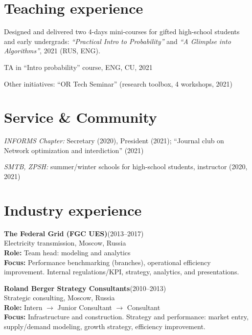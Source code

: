 \documentclass[11pt]{article} \usepackage{geometry} %
\newcommand{\jobl}[5]{%
  \textbf{#1}\hfill (#2)\\
  #3\vspace{0.25em}\\
  \textbf{Role:} #4\\
  \textbf{Focus:} #5}
\newcommand{\job}[5]{%
  \jobl{#1}{#2}{#3}{#4}{#5}\vspace{0.5em}
}
\begin{document}
 \begin{minipage}[t]{0.49\textwidth}
   \section*{Teaching experience}
   Designed and delivered  two 4-days mini-courses for gifted
   high-school students and early undergrads: \textit{``Practical Intro to Probability''}
   and \textit{``A Glimplse into Algorithms''}, 2021 (RUS, ENG).

   TA in ``Intro probability'' course, ENG, CU, 2021\vspace{0.3em}

   Other initiatives: ``OR Tech Seminar'' (research toolbox, 4 workshops, 2021)

   \section*{Service \& Community}
   \textit{INFORMS Chapter:} Secretary (2020),
   President (2021);
   ``Journal club on Network optimization and interdiction'' (2021)

   \textit{SMTB, ZPSH:} summer/winter schools for high-school students,
   instructor (2020, 2021)\\

   \section*{Industry experience}
   \job{The Federal Grid (FGC UES)}{2013--2017}{Electricity transmission,
     Moscow, Russia}{Team head: modeling and analytics}{Performance
     benchmarking (branches), operational efficiency improvement. Internal
     regulations/KPI, strategy, analytics, and presentations.}

   \jobl{Roland Berger Strategy Consultants}{2010--2013}{Strategic consulting,
     Moscow, Russia}{ Intern $\rightarrow$ Junior
     Consultant $\rightarrow$ Consultant}{Infrastructure and construction.
     Strategy and performance: market entry, supply/demand modeling, growth
     strategy, efficiency improvement.}
 \end{minipage}
\end{document}

